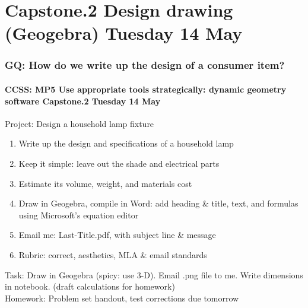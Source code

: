 \documentclass{beamer}
\begin{document}
\section{Capstone.2 Design drawing (Geogebra) Tuesday 14 May}
  \frame
  {
    \frametitle{GQ: How do we write up the design of a consumer item?}
    \framesubtitle{CCSS: MP5 Use appropriate tools strategically: dynamic geometry software \hfill \alert{Capstone.2 Tuesday 14 May}}

    \begin{block}{Project: Design a household lamp fixture}
      \begin{enumerate}
        \item Write up the design and specifications of a household lamp
        \item Keep it simple: leave out the shade and electrical parts
        \item Estimate its volume, weight, and materials cost
        \item Draw in Geogebra, compile in Word: add heading \& title, text, and formulas using Microsoft's equation editor
        \item Email me: Last-Title.pdf, with subject line \& message
        \item Rubric: correct, aesthetics, MLA \& email standards
      \end{enumerate}
    \end{block}
    Task: Draw in Geogebra (spicy: use 3-D). Email .png file to me. Write dimensions in notebook. (draft calculations for homework)\\
    Homework: Problem set handout, test corrections due tomorrow
      }
\end{document}
